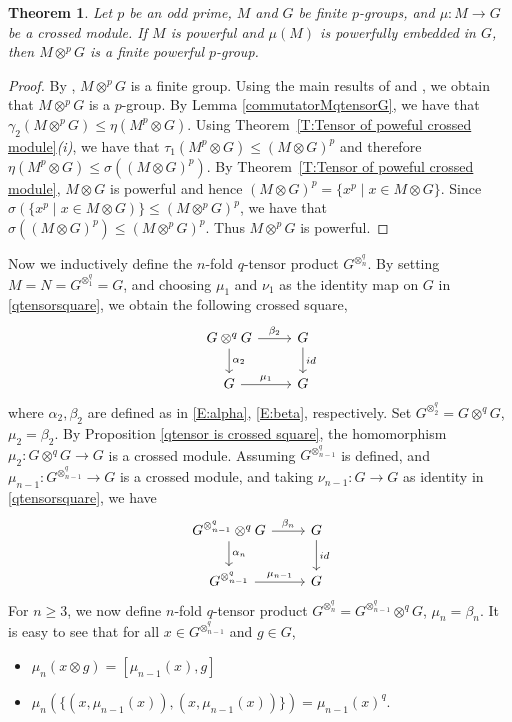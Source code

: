 \documentclass[12pt]{elsarticle}
\newtheorem{theorem}{Theorem}[section]
\newtheorem*{main corollary*}{Main Corollary}
\theoremstyle{definition}
\newcommand{\tens}{
	\otimes^q}
\newcommand{\ptens}{
	\otimes^p}
\begin{document}
\begin{theorem} \label{qtensorpowerful}
 Let $p$ be an odd prime, $M$ and $G$ be finite $p$-groups, and $\mu:M\to G$ be a crossed module. If $M$ is powerful and $\mu(M)$ is powerfully embedded in $G$, then $M \otimes^p G$ is a finite powerful $p$-group.
\end{theorem}
\begin{proof}
 By \cite[Corollary 12]{MR1088877}, $M \ptens G$ is a finite group. Using the main results of \cite{E87} and \cite[Propositon 11]{MR1088877}, we obtain that $M \ptens G$ is a $p$-group.
	By Lemma \ref{commutatorMqtensorG}, we have that $\gamma_2(M \otimes^p G) \leqslant \eta(M^p \otimes G)$. Using Theorem~\ref{T:Tensor of poweful crossed module}\textit{(i)}, we have that $\tau_1(M^p \otimes G)\leqslant (M \otimes G)^p$ and therefore $ {\eta(M^p \otimes G) \leqslant \sigma((M \otimes G)^p)}$. By Theorem~\ref{T:Tensor of poweful crossed module}, $M \otimes G$ is powerful and hence $(M \otimes G)^p=\{x^p \mid x \in M \otimes G\}$. Since $\sigma(\{x^p \mid x \in M \otimes G)\} \leqslant (M \ptens G)^p$, we have that ${\sigma((M \otimes G)^p) \leqslant (M \ptens G)^p}$. Thus $M \ptens G$ is powerful. 
\end{proof}
Now we inductively define the $n$-fold $q$-tensor product $G^{\otimes^q_{n}}$. 
By setting $M=N=G^{\otimes^q_1}=G$, and choosing $\mu_1$ and $\nu_1$ as the identity map on $G$ in \eqref{qtensorsquare}, we obtain the following crossed square, 
\begin{equation}
\begin{tikzcd}
		G\tens G \arrow[r,"\beta_{2}"] \arrow[d,"\alpha_2"] & G \arrow[d,"id"] \\
		G \arrow[r,"\mu_1"] & G
	\end{tikzcd}\label{n fold qtensorsquare1}
\end{equation}
where $\alpha_2,\beta_2$ are defined as in \eqref{E:alpha}, \eqref{E:beta}, respectively. Set $G^{\otimes^q_2}=G\tens G$, $\mu_2=\beta_2$.
By Proposition \ref{qtensor is crossed square}, the homomorphism $\mu_2: G \tens G  \to G$ is a crossed module.
Assuming $G^{\otimes^q_{n-1}}$ is defined, and $\mu_{n-1}:G^{\otimes^q_{n-1}}\to G$ is a crossed module, and taking $\nu_{n-1}:G\to G$ as identity in \eqref{qtensorsquare}, we have
      \begin{equation}
\begin{tikzcd}
		G^{\otimes^q_{n-1}}\tens G \arrow[r,"\beta_{n}"] \arrow[d,"\alpha_n"] & G \arrow[d,"id"] \\
		G^{\otimes^q_{n-1}} \arrow[r,"\mu_{n-1}"] & G
	\end{tikzcd}\label{q n fold tensorsquare}
\end{equation}
For $n\geq 3$, we now define $n$-fold $q$-tensor product $G^{\otimes^q_{n}}= G^{\otimes^q_{n-1}}\tens G$, $\mu_n=\beta_n$. It is easy to see that for all $x \in G^{\otimes^q_{n-1}}$ and $g \in G$,
\begin{itemize}
    \item[\textit{(i)}] $\mu_n(x \otimes g)=[\mu_{n-1}(x),g]$
    \item[\textit{(ii)}] $\mu_n(\{(x,\mu_{n-1}(x)),(x,\mu_{n-1}(x))\})={\mu_{n-1}(x)}^q$.
\end{itemize}
\end{document}
